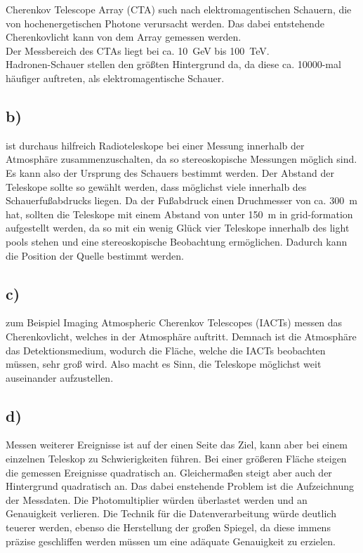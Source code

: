     \justifying Cherenkov Telescope Array (CTA) such nach elektromagentischen Schauern, die von hochenergetischen
    Photone verursacht werden. Das dabei entstehende Cherenkovlicht kann von dem Array gemessen werden.\\
    Der Messbereich des CTAs liegt bei ca. \SI{10}{\giga\electronvolt} bis \SI{100}{\tera\electronvolt}.\\
    Hadronen-Schauer stellen den größten Hintergrund da, da diese ca. 10000-mal häufiger auftreten, als 
    elektromagentische Schauer.

\subsection{b)}

    \justifying ist durchaus hilfreich Radioteleskope bei einer Messung innerhalb der Atmosphäre 
    zusammenzuschalten, da so stereoskopische Messungen möglich sind. Es kann also der Ursprung des Schauers bestimmt
    werden. Der Abstand der Teleskope sollte so gewählt werden, dass möglichst viele innerhalb des Schauerfußabdrucks 
    liegen. Da der Fußabdruck einen Druchmesser von ca. \SI{300}{\meter} hat, sollten die Teleskope mit einem Abstand von unter
    \SI{150}{\meter} in grid-formation aufgestellt werden, da so mit ein wenig Glück vier Teleskope innerhalb des light pools
    stehen und eine stereoskopische Beobachtung ermöglichen. Dadurch kann die Position der Quelle bestimmt werden. 

\subsection{c)}

    \justifying zum Beispiel Imaging Atmospheric Cherenkov Telescopes (IACTs) messen das Cherenkovlicht, welches in der 
    Atmosphäre auftritt. Demnach ist die Atmosphäre das Detektionsmedium, wodurch die Fläche, welche die IACTs beobachten müssen, sehr groß
    wird. Also macht es Sinn, die Teleskope möglichst weit auseinander aufzustellen.  

\subsection{d)}

    \justifying Messen weiterer Ereignisse ist auf der einen Seite das Ziel, kann aber bei einem einzelnen Teleskop zu Schwierigkeiten
    führen. Bei einer größeren Fläche steigen die gemessen Ereignisse quadratisch an. Gleichermaßen steigt aber auch der Hintergrund quadratisch an. 
    Das dabei enstehende Problem ist die Aufzeichnung der Messdaten. Die Photomultiplier würden überlastet werden und an Genauigkeit verlieren. Die
    Technik für die Datenverarbeitung würde deutlich teuerer werden, ebenso die Herstellung der großen Spiegel, da diese immens präzise geschliffen werden 
    müssen um eine adäquate Genauigkeit zu erzielen. 


